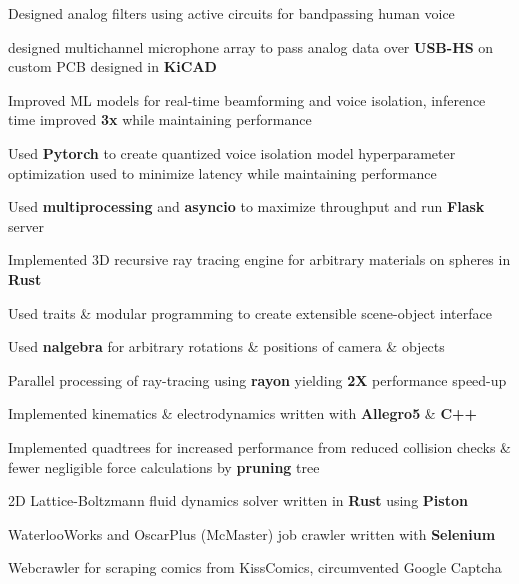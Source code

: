 \documentclass[]{chandan-cv}
\begin{document}
\begin{minipage}[t]{0.77\textwidth}
\descript{ }
\location{ }
\begin{tightemize}
	\item Designed analog filters using active circuits for bandpassing human voice
	\item designed multichannel microphone array to pass analog data over \textbf{USB-HS} on custom PCB designed in \textbf{KiCAD}
	\item Improved ML models for real-time beamforming and voice isolation, inference time improved \textbf{3x} while maintaining performance
	\item Used \textbf{Pytorch} to create quantized voice isolation model hyperparameter optimization used to minimize latency while maintaining performance 
	\item Used \textbf{multiprocessing} and \textbf{asyncio} to maximize throughput and run \textbf{Flask} server
\end{tightemize}
\sectionsep


\descript{ }
\location{ }
\begin{tightemize}
	\item Implemented 3D recursive ray tracing engine for arbitrary materials on spheres in \textbf{Rust}
	\item Used traits \& modular programming to create extensible scene-object interface
	\item Used \textbf{nalgebra} for arbitrary rotations \& positions of camera \& objects 
	\item Parallel processing of ray-tracing using \textbf{rayon} yielding \textbf{2X} performance speed-up
\end{tightemize}
\sectionsep

\descript{ }
\location{ }
\begin{tightemize}
	\item Implemented kinematics \& electrodynamics written with \textbf{Allegro5} \& \textbf{C++}
	\item Implemented quadtrees for increased performance from reduced collision checks \& fewer 
	negligible force calculations by \textbf{pruning} tree
\end{tightemize}
\sectionsep

\descript{ }
\location{ }
\begin{tightemize}
	\item 2D Lattice-Boltzmann fluid dynamics solver written in \textbf{Rust} using \textbf{Piston}
	\item WaterlooWorks and OscarPlus (McMaster) job crawler written with \textbf{Selenium}
	\item Webcrawler for scraping comics from KissComics, circumvented Google Captcha
\end{tightemize}
\sectionsep


\end{minipage}
\end{document}
